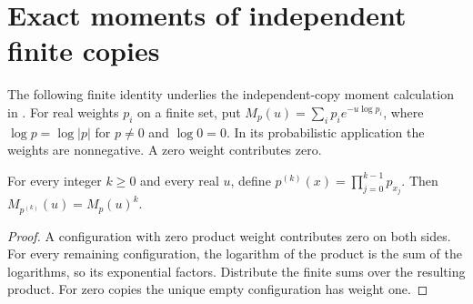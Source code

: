 \section{Exact moments of independent finite copies}

The following finite identity underlies the independent-copy moment
calculation in \cite[Section~8]{OpenAI2026AreaLaw}. For real weights
$p_i$ on a finite set, put $M_p(u)=\sum_i p_i e^{-u\log p_i}$, where
$\log p=\log|p|$ for $p\ne0$ and $\log0=0$. In its probabilistic
application the weights are nonnegative. A zero weight contributes zero.

\begin{theorem}
  \label{thm:surprisal_product_moment}
  \leanok
  For every integer $k\geq0$ and every real $u$, define
  $p^{(k)}(x)=\prod_{j=0}^{k-1}p_{x_j}$. Then
  $M_{p^{(k)}}(u)=M_p(u)^k$.
\end{theorem}
\begin{proof}
  \leanok
  A configuration with zero product weight contributes zero on both
  sides. For every remaining configuration, the logarithm of the
  product is the sum of the logarithms, so its exponential factors.
  Distribute the finite sums over the resulting product. For zero
  copies the unique empty configuration has weight one.
\end{proof}
